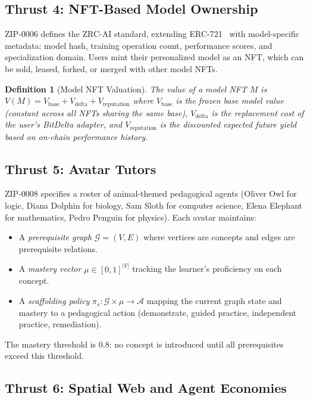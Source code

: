 \documentclass[11pt,letterpaper]{article}
\newtheorem{definition}{Definition}[section]
\begin{document}
\subsection{Thrust 4: NFT-Based Model Ownership}

ZIP-0006 defines the ZRC-AI standard, extending ERC-721~\cite{entriken2018erc721} with model-specific metadata: model hash, training operation count, performance scores, and specialization domain. Users mint their personalized model as an NFT, which can be sold, leased, forked, or merged with other model NFTs.

\begin{definition}[Model NFT Valuation]
The value of a model NFT $M$ is
$V(M) = V_{\text{base}} + V_{\text{delta}} + V_{\text{reputation}}$
where $V_{\text{base}}$ is the frozen base model value (constant across all NFTs sharing the same base), $V_{\text{delta}}$ is the replacement cost of the user's BitDelta adapter, and $V_{\text{reputation}}$ is the discounted expected future yield based on on-chain performance history.
\end{definition}

\subsection{Thrust 5: Avatar Tutors}

ZIP-0008 specifies a roster of animal-themed pedagogical agents (Oliver Owl for logic, Diana Dolphin for biology, Sam Sloth for computer science, Elena Elephant for mathematics, Pedro Penguin for physics). Each avatar maintains:

\begin{itemize}
    \item A \emph{prerequisite graph} $\mathcal{G} = (V, E)$ where vertices are concepts and edges are prerequisite relations.
    \item A \emph{mastery vector} $\mu \in [0, 1]^{|V|}$ tracking the learner's proficiency on each concept.
    \item A \emph{scaffolding policy} $\pi_s: \mathcal{G} \times \mu \to \mathcal{A}$ mapping the current graph state and mastery to a pedagogical action (demonstrate, guided practice, independent practice, remediation).
\end{itemize}

The mastery threshold is 0.8: no concept is introduced until all prerequisites exceed this threshold.

\subsection{Thrust 6: Spatial Web and Agent Economies}
\end{document}
